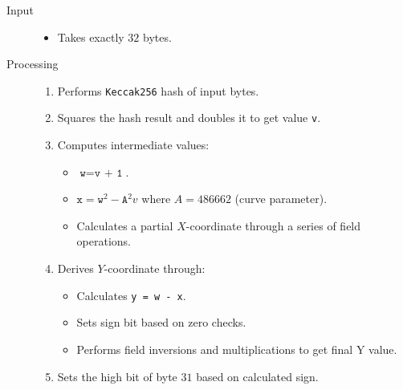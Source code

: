 \documentclass[12pt,a4paper]{article}
\begin{document}
\begin{description}
\item[Input] \hfill
\begin{itemize}
\item Takes exactly $32$ bytes.  %
\end{itemize}

\item[Processing] \hfill
\begin{enumerate}
\item Performs \texttt{Keccak256} hash of input bytes.  %
\item Squares the hash result and doubles it to get value \texttt{v}.  %
\item Computes intermediate values:
  \begin{itemize}
  \item $\texttt{w} = \texttt{v + 1}$.  %
  \item $\texttt{x} = \texttt{w}^2 - \texttt{A}^2v$ where $A = 486662$ (curve parameter).  %
  \item Calculates a partial $X$-coordinate through a series of field operations.  %
  \end{itemize}
\item Derives $Y$-coordinate through:
  \begin{itemize}
  \item Calculates \texttt{y = w - x}.  %
  \item Sets sign bit based on zero checks.  %
  \item Performs field inversions and multiplications to get final Y value.  %
  \end{itemize}
\item Sets the high bit of byte $31$ based on calculated sign.  %
\end{enumerate}


\end{description}
\end{document}
